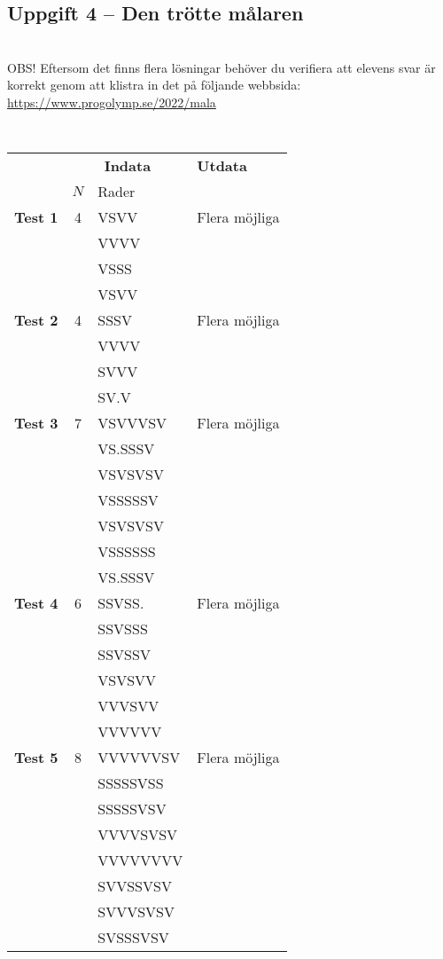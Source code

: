 \documentclass[a4paper,12pt,oneside]{amsbook}
\theoremstyle{test}
\newcommand{\fe}[1]{\textbf{#1}}            %
\begin{document}
\subsection*{Uppgift 4 -- Den trötte målaren}
~\\
OBS! Eftersom det finns flera lösningar behöver du verifiera att
elevens svar är korrekt genom att klistra in det på följande webbsida: \\
\url{https://www.progolymp.se/2022/mala}
~\\
{\tt 
\begin{tabular}{||l||c|l||l||}\hline\hline
& \multicolumn{2}{c||}{\fe{Indata}} & \fe{Utdata} \\
& $N$ & Rader & \\ \hline \hline
\fe{Test 1} &4&VSVV & Flera möjliga \\
&&VVVV&\\
&&VSSS&\\
&&VSVV&\\\hline
\fe{Test 2} &4&SSSV & Flera möjliga \\
&&VVVV&\\
&&SVVV&\\
&&SV.V&\\\hline
\fe{Test 3} &7&VSVVVSV & Flera möjliga \\
&&VS.SSSV&\\
&&VSVSVSV&\\
&&VSSSSSV&\\
&&VSVSVSV&\\
&&VSSSSSS&\\
&&VS.SSSV&\\\hline
\fe{Test 4} &6&SSVSS. & Flera möjliga \\
&&SSVSSS&\\
&&SSVSSV&\\
&&VSVSVV&\\
&&VVVSVV&\\
&&VVVVVV&\\\hline
\fe{Test 5} &8&VVVVVVSV & Flera möjliga \\
&&SSSSSVSS&\\
&&SSSSSVSV&\\
&&VVVVSVSV&\\
&&VVVVVVVV&\\
&&SVVSSVSV&\\
&&SVVVSVSV&\\
&&SVSSSVSV&\\\hline\hline
\end{tabular}
}
\end{document}
